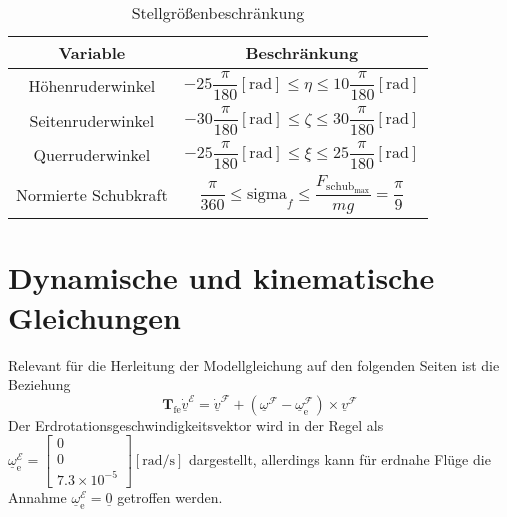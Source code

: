 \begin{table}[h]
\centering
\setlength{\tabcolsep}{12pt} %
\renewcommand{\arraystretch}{1.5} %
 \begin{tabular}{||c c ||} 
 \hline
 Variable & Beschränkung \\ [0.5ex] 
 \hline\hline
  Höhenruderwinkel & $-25\dfrac{\pi}{180}[\mathrm{rad}]\leq\eta\leq 10\dfrac{\pi}{180}[\mathrm{rad}]$\\
  Seitenruderwinkel & $-30 \dfrac{\pi}{180}[\mathrm{rad}]\leq\zeta\leq 30\dfrac{\pi}{180}[\mathrm{rad}]$\\
  Querruderwinkel & $-25 \dfrac{\pi}{180}[\mathrm{rad}]\leq\xi\leq 25\dfrac{\pi}{180}[\mathrm{rad}]$\\
  Normierte Schubkraft & $\dfrac{\pi}{360}\leq\mathrm{sigma}_f\leq \dfrac{F_\mathrm{schub_{max}}}{mg} = \dfrac{\pi}{9}$\\ 
\hline
\end{tabular}
\caption{Stellgrößenbeschränkung}
\label{tab:SGF}
\end{table}


\section{Dynamische und kinematische Gleichungen}
\label{sec:Dynamik}
Relevant für die Herleitung der Modellgleichung auf den folgenden Seiten ist die Beziehung\\
\begin{equation}
\label{fun:Tfe}
\textbf{T}_\mathrm{fe}\underline{\dot{v}}^\mathcal{E} = \underline{\dot{v}}^\mathcal{F} + (\underline{\omega}^\mathcal{F}-\underline{\omega}^\mathcal{F}_\mathrm{e})\times\underline{v}^\mathcal{F}
\end{equation}
Der Erdrotationsgeschwindigkeitsvektor wird in der Regel als $\underline{\omega}^\mathcal{E}_\mathrm{e} = \begin{bmatrix} 
0 \\ 0 \\ 7.3\times 10^{-5} 
\end{bmatrix}\mathrm{[rad/s]}$ dargestellt, allerdings kann für erdnahe Flüge die Annahme $\underline{\omega}^\mathcal{E}_\mathrm{e} = \underline{0}$ getroffen werden.
